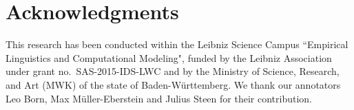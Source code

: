\documentclass[11pt]{article}
\begin{document}
%
%
%
\fi
\section{Acknowledgments}
This research has been conducted within the Leibniz Science Campus ``Empirical Linguistics and Computational Modeling",
funded by the Leibniz Association under grant no.\ SAS-2015-IDS-LWC and by the Ministry of Science, Research, and Art (MWK) of the state of Baden-W\"urttemberg. We thank  our annotators Leo Born, Max M\"uller-Eberstein and Julius Steen for their contribution.




\appendix
\end{document}

